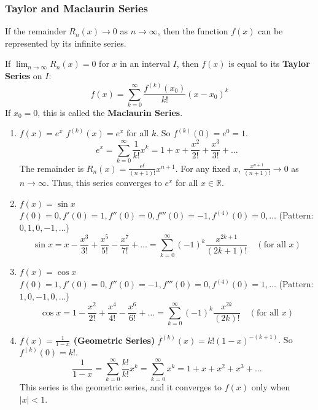 \documentclass[oneside]{book}
\begin{document}
\subsubsection{Taylor and Maclaurin Series}
If the remainder $R_n(x) \to 0$ as $n \to \infty$, then the function $f(x)$ can be represented by its infinite series.

\begin{definition}
If $\lim_{n \to \infty} R_n(x) = 0$ for $x$ in an interval $I$, then $f(x)$ is equal to its \textbf{Taylor Series} on $I$:
\[
f(x) = \sum_{k=0}^{\infty} \frac{f^{(k)}(x_0)}{k!} (x-x_0)^k
\]
If $x_0 = 0$, this is called the \textbf{Maclaurin Series}.
\end{definition}

\begin{example}
\begin{enumerate}
    \item \textbf{$f(x) = e^x$}
    $f^{(k)}(x) = e^x$ for all $k$. So $f^{(k)}(0) = e^0 = 1$.
    \[
    e^x = \sum_{k=0}^{\infty} \frac{1}{k!} x^k = 1 + x + \frac{x^2}{2!} + \frac{x^3}{3!} + \dots
    \]
    The remainder is $R_n(x) = \frac{e^\xi}{(n+1)!} x^{n+1}$. For any fixed $x$, $\frac{x^{n+1}}{(n+1)!} \to 0$ as $n \to \infty$. Thus, this series converges to $e^x$ for all $x \in \mathbb{R}$.

    \item \textbf{$f(x) = \sin x$}
    $f(0)=0, f'(0)=1, f''(0)=0, f'''(0)=-1, f^{(4)}(0)=0, \dots$ (Pattern: $0, 1, 0, -1, \dots$)
    \[
    \sin x = x - \frac{x^3}{3!} + \frac{x^5}{5!} - \frac{x^7}{7!} + \dots = \sum_{k=0}^{\infty} (-1)^k \frac{x^{2k+1}}{(2k+1)!} \quad (\text{for all } x)
    \]

    \item \textbf{$f(x) = \cos x$}
    $f(0)=1, f'(0)=0, f''(0)=-1, f'''(0)=0, f^{(4)}(0)=1, \dots$ (Pattern: $1, 0, -1, 0, \dots$)
    \[
    \cos x = 1 - \frac{x^2}{2!} + \frac{x^4}{4!} - \frac{x^6}{6!} + \dots = \sum_{k=0}^{\infty} (-1)^k \frac{x^{2k}}{(2k)!} \quad (\text{for all } x)
    \]
    
    \item \textbf{$f(x) = \frac{1}{1-x}$ (Geometric Series)}
    $f^{(k)}(x) = k! (1-x)^{-(k+1)}$. So $f^{(k)}(0) = k!$.
    \[
    \frac{1}{1-x} = \sum_{k=0}^{\infty} \frac{k!}{k!} x^k = \sum_{k=0}^{\infty} x^k = 1 + x + x^2 + x^3 + \dots
    \]
    This series is the geometric series, and it converges to $f(x)$ only when $|x| < 1$.
\end{enumerate}
\end{example}
\end{document}
